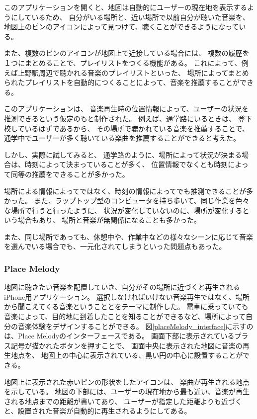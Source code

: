 \documentclass[11pt, onecolumn]{jsarticle}
\begin{document}
このアプリケーションを開くと、地図は自動的にユーザーの現在地を表示するようにしているため、
自分がいる場所と、近い場所で以前自分が聴いた音楽を、
地図上のピンのアイコンによって見つけて、聴くことができるようになっている。

また、複数のピンのアイコンが地図上で近接している場合には、
複数の履歴を１つにまとめることで、プレイリストをつくる機能がある。
これによって、例えば上野駅周辺で聴かれる音楽のプレイリストといった、
場所によってまとめられたプレイリストを自動的につくることによって、音楽を推薦することができる。

このアプリケーションは、
音楽再生時の位置情報によって、ユーザーの状況を推測できるという仮定のもと制作された。
例えば、通学路にいるときは、
登下校しているはずであるから、
その場所で聴かれている音楽を推薦することで、
通学中でユーザーが多く聴いている楽曲を推薦することができると考えた。

しかし、実際に試してみると、
通学路のように、場所によって状況が決まる場合は、時刻によって決まっていることが多く、
位置情報でなくとも時刻によって同等の推薦をできることが多かった。

場所による情報によってではなく、時刻の情報によってでも推測できることが多かった。
また、ラップトップ型のコンピュータを持ち歩いて、同じ作業を色々な場所で行うと行ったように、
状況が変化していないのに、場所が変化するという場合もあり、
場所と音楽が無関係になることも多かった。

また、同じ場所であっても、休憩中や、作業中などの様々なシーンに応じて音楽を選んでいる場合でも、一元化されてしまうといった問題点もあった。

\subsubsection{Place Melody}
地図に聴きたい音楽を配置していき、自分がその場所に近づくと再生されるiPhone用アプリケーション。
選択しなければいけない音楽再生ではなく、場所から聞こえてくる音楽ということとをテーマに制作した。
電車に乗っていても音楽によって、目的地に到着したことを知ることができるなど、場所によって自分の音楽体験をデザインすることができる。
図\ref{placeMelody_interface}に示すのは、Place Melodyのインターフェースである。
画面下部に表示されているプラス記号が描かれたボタンを押すことで、
画面中央に表示された地図に音楽の再生地点を、
地図上の中心に表示されている、黒い円の中心に設置することができる。

地図上に表示された赤いピンの形状をしたアイコンは、
楽曲が再生される地点を示している。
地図の下部には、ユーザーの現在地から最も近い、音楽が再生される地点までの距離が書いてあり、
ユーザーが指定した距離よりも近づくと、設置された音楽が自動的に再生されるようにしてある。
\end{document}
